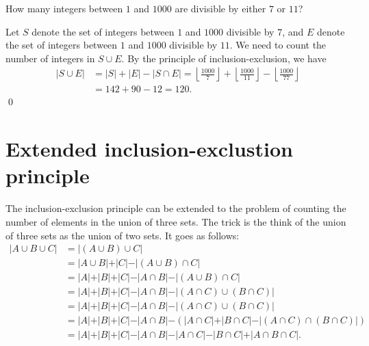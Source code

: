 \begin{exmp}
How many integers between $1$ and $1000$ are divisible by either
$7$ or $11$?
\end{exmp}
\begin{soln}
 Let $S$ denote the set of integers between $1$ and $1000$ divisible by $7$, and
 $E$ denote the set of integers between $1$ and $1000$ divisible by $11$.
 We need to count the number of integers in $S\cup E$. By the
 principle of inclusion-exclusion, we have
 \begin{align*}
 \lvert S\cup E\rvert &= \lvert S\rvert+\lvert E\rvert-\lvert S\cap E\rvert 
 = \left\lfloor{\frac{1000}{7}}\right\rfloor+ 
 \left\lfloor{\frac{1000}{11}}\right\rfloor-
 \left\lfloor{\frac{1000}{77}}\right\rfloor \\
 &= 142+90-12 = 120.
\end{align*}\;\qed
\end{soln}

\section{Extended inclusion-exclustion principle}
The inclusion-exclusion principle can be extended to the problem of counting the number
of elements in the union of three sets. The trick is the think of the union of three sets as the
union of two sets. It goes as follows:
\begin{align*}
 \lvert A\cup B \cup C\lvert  &= \lvert (A\cup B) \cup C\lvert  \\
 &= \lvert A\cup B\lvert  +\lvert C\lvert  - \lvert (A\cup B)\cap C\lvert  \\
 &= \lvert A\lvert +\lvert B\lvert +\lvert C\lvert -\lvert A\cap B\lvert  -  \lvert (A\cup B)\cap C\lvert  \\
 &= \lvert A\lvert +\lvert B\lvert +\lvert C\lvert -\lvert A\cap B\lvert  -  \lvert (A\cap C)\cup (B\cap C)\lvert  \\
 &= \lvert A\lvert +\lvert B\lvert +\lvert C\lvert -\lvert A\cap B\lvert  -  \lvert (A\cap C)\cup (B\cap C)\lvert  \\
 &= \lvert A\lvert +\lvert B\lvert +\lvert C\lvert -\lvert A\cap B\lvert  -\left(\lvert A\cap C\lvert + \lvert B\cap C\lvert  - \lvert (A\cap C)\cap(B\cap C)\lvert \right) \\
 &= \lvert A\lvert +\lvert B\lvert +\lvert C\lvert -\lvert A\cap B\lvert  - \lvert A\cap C\lvert - \lvert B\cap C\lvert  +\lvert A\cap B\cap C\lvert. 
\end{align*}


